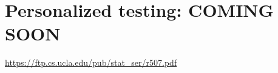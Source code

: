 \chapter{Personalized testing: COMING SOON}
\label{ch-personalized-testing}

\url{https://ftp.cs.ucla.edu/pub/stat_ser/r507.pdf}